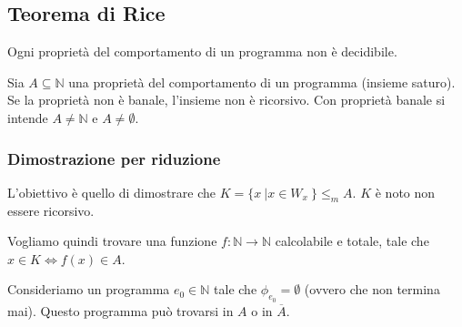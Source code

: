 \subsection{Teorema di Rice}

Ogni proprietà del comportamento di un programma non è decidibile.

Sia $A \subseteq \mathbb{N}$ una proprietà del comportamento di un programma (insieme saturo). Se la proprietà non è banale, l'insieme non è ricorsivo. Con proprietà banale si intende $A \neq \mathbb{N}$ e $A \neq \emptyset$. 

\subsubsection{Dimostrazione per riduzione}

L'obiettivo è quello di dimostrare che $K = \{ x \: | x \in W_x\: \} \leq_m A$. $K$ è noto non essere ricorsivo.

Vogliamo quindi trovare una funzione $f : \mathbb{N} \rightarrow \mathbb{N}$ calcolabile e totale, tale che $x \in K \Leftrightarrow f(x) \in A$.

Consideriamo un programma $e_0 \in \mathbb{N}$ tale che $\phi_{e_0} = \emptyset$ (ovvero che non termina mai). Questo programma può trovarsi in $A$ o in $\overline{A}$.

